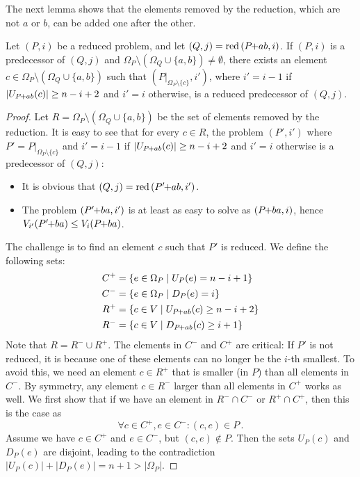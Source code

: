 \documentclass[a4paper,UKenglish,cleveref, autoref, thm-restate]{lipics-v2021}
\newcommand{\pchild}[3]{{#1}\kern-1pt{+}{#2}{#3}}
\newcommand{\reduced}[1]{\operatorname{red}{#1}}
\newcommand{\less}[2]{D_{#1}(#2)}
\newcommand{\greater}[2]{U_{#1}(#2)}
\begin{document}
The next lemma shows that the elements removed by the reduction, which are not $a$ or $b$, can be added one after the other.

\begin{lemma} \label{lemma:remove_elements_iteratively}
  Let $(P, i)$ be a reduced problem, and let $(Q, j) = \reduced{(\pchild{P}{a}{b}, i)}$.
  If $(P, i)$ is a predecessor of $(Q, j)$ and $\Omega_P \setminus (\Omega_Q \cup \{a, b\}) \neq \emptyset$, there exists an element $c \in \Omega_P \setminus (\Omega_Q \cup \{a, b\})$ such that $(P|_{\Omega_P \setminus \{c\}}, i')$, where $i' = i - 1$ if $|\greater{\pchild{P}{a}{b}}{c}| \ge n - i + 2$ and $i' = i$ otherwise, is a reduced predecessor of $(Q, j)$.
\end{lemma}

\begin{proof}
  Let $R = \Omega_P \setminus (\Omega_Q \cup \{a, b\})$ be the set of elements removed by the reduction.
  It is easy to see that for every $c \in R$, the problem $(P', i')$ where $P' = P|_{\Omega_P \setminus \{c\}}$ and $i' = i - 1$ if $|\greater{\pchild{P}{a}{b}}{c}| \ge n - i + 2$ and $i' = i$ otherwise is a predecessor of $(Q, j)$:
  \begin{itemize}
    \item It is obvious that $(Q, j) = \reduced{(\pchild{P'}{a}{b}, i')}$.
    \item The problem $(\pchild{P'}{b}{a}, i')$ is at least as easy to solve as $(\pchild{P}{b}{a}, i)$, hence $V_{i'}(\pchild{P'}{b}{a}) \leq V_i(\pchild{P}{b}{a})$.
  \end{itemize}
  The challenge is to find an element $c$ such that $P'$ is reduced.
  We define the following sets:
  \begin{align*}
    C^+ & = \{e \in \Omega_P \mid \greater{P}{e} = n - i + 1\}            \\
    C^- & = \{e \in \Omega_P \mid \less{P}{e} = i \}                      \\
    R^+ & = \{c \in V \mid \greater{\pchild{P}{a}{b}}{c} \ge n - i + 2 \} \\
    R^- & = \{c \in V \mid \less{\pchild{P}{a}{b}}{c} \ge i + 1 \}
  \end{align*}
  Note that $R = R^- \cup R^+$.
  The elements in $C^-$ and $C^+$ are critical:
  If $P'$ is not reduced, it is because one of these elements can no longer be the $i$-th smallest.
  To avoid this, we need an element $c \in R^+$ that is smaller (in $P$) than all elements in $C^-$.
  By symmetry, any element $c \in R^-$ larger than all elements in $C^+$ works as well.
  We first show that if we have an element in $R^- \cap C^-$ or $R^+ \cap C^+$, then this is the case as
  \begin{equation}
    \forall c \in C^+, e \in C^- \colon (c, e) \in P\,\text{.}
  \end{equation}
  Assume we have $c \in C^+$ and $e \in C^-$, but $(c, e) \notin P$.
  Then the sets $\greater{P}{c}$ and $\less{P}{e}$ are disjoint, leading to the contradiction $|\greater{P}{c}| + |\less{P}{e}| = n + 1 > |\Omega_P|$.


\end{proof}
\end{document}
